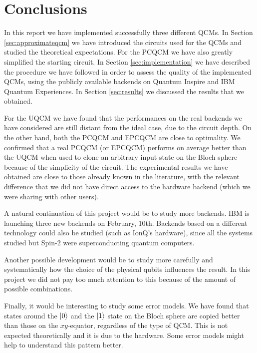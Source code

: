 \chapter{Conclusions}
\label{sec:conclusions}

In this report we have implemented successfully three different QCMs.
In Section \ref{sec:approximateqcm} we have introduced the circuits used for the QCMs and studied the theoretical expectations.
For the PCQCM we have also greatly simplified the starting circuit.
In Section \ref{sec:implementation} we have described the procedure we have followed in order to assess the quality of the implemented QCMs, using the publicly available backends on Quantum Inspire and IBM Quantum Experiences.
In Section \ref{sec:results} we discussed the results that we obtained.

For the UQCM we have found that the performances on the real backends we have considered are still distant from the ideal case, due to the circuit depth.
On the other hand, both the PCQCM and EPCQCM are close to optimality. 
We confirmed that a real PCQCM (or EPCQCM) performs on average better than the UQCM when used to clone an arbitrary input state on the Bloch sphere because of the simplicity of the circuit.
The experimental results we have obtained are close to those already known in the literature, with the relevant difference that we did not have direct access to the hardware backend (which we were sharing with other users). 

A natural continuation of this project would be to study more backends. 
IBM is launching three new backends on February, 10th.
Backends based on a different technology could also be studied (such as IonQ's hardware), since all the systems studied but Spin-2 were superconducting quantum computers.

Another possible development would be to study more carefully and systematically how the choice of the physical qubits influences the result.
In this project we did not pay too much attention to this because of the amount of possible combinations.

Finally, it would be interesting to study some error models. 
We have found that states around the $\ket{0}$ and the $\ket{1}$ state on the Bloch sphere are copied better than those on the $xy$-equator, regardless of the type of QCM.
This is not expected theoretically and it is due to the hardware. Some error models might help to understand this pattern better.
